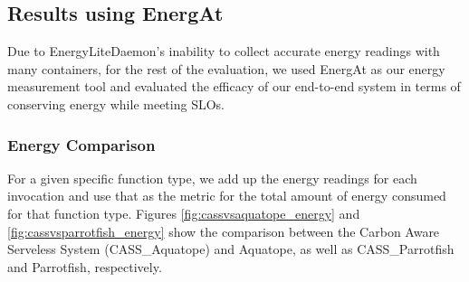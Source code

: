 \documentclass[times, 10pt,twocolumn]{article}
\begin{document}
\subsection{Results using EnergAt}

Due to EnergyLiteDaemon's inability to collect accurate energy readings with many containers, for the rest of the evaluation, we used EnergAt as our energy measurement tool and evaluated the efficacy of our end-to-end system in terms of conserving energy while meeting SLOs. 

\subsubsection{Energy Comparison}
For a given specific function type, we add up the energy readings for each invocation and use that as the metric for the total amount of energy consumed for that function type. Figures \ref{fig:cassvsaquatope_energy} and \ref{fig:cassvsparrotfish_energy} show the comparison between the Carbon Aware Serveless System (CASS\_Aquatope) and Aquatope, as well as CASS\_Parrotfish and Parrotfish, respectively. 
\end{document}
